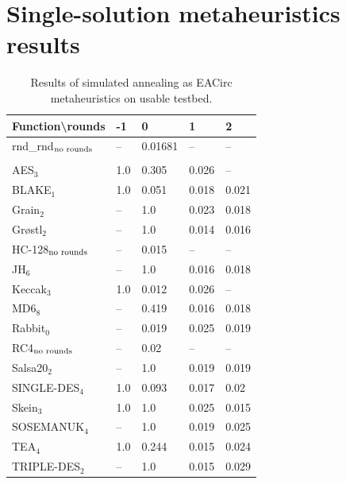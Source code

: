 \documentclass[
  print, %
  Table,   %
  nolof,     %
  nolot,     %
  11pt, %
  oneside  %
]{fithesis3}
\newcommand{\fd}{\cellcolor{myred!15}}
\newcommand{\fn}{\cellcolor{mygreen!20}}
\begin{document}
\chapter{Single-solution metaheuristics results}
\label{sec:app-ss-res}

\begin{table}[H]
\centering
\begin{tabular}{l|l l l l}
Function\textbackslash{}rounds & -1 & 0 & 1 & 2\\ \hline
rnd\_rnd$_{\textnormal{no rounds}}$ & -- & \fn{}0.01681& -- & --    \\\\
AES$_{3}$        & \fd{}1.0   & \fd{}0.305 & \fn{}0.026 & \fn{}--   \\
BLAKE$_{1}$      & \fd{}1.0   & \fd{}0.051 & \fn{}0.018 & \fn{}0.021\\
Grain$_{2}$      & \fd{}--    & \fd{}1.0   & \fn{}0.023 & \fn{}0.018\\
Gr\o stl$_{2}$   & \fd{}--    & \fd{}1.0   & \fn{}0.014 & \fn{}0.016\\
HC-128$_{\textnormal{no rounds}}$& -- & \fn{}0.015 & -- & --        \\
JH$_{6}$         & \fd{}--    & \fd{}1.0   & \fn{}0.016 & \fn{}0.018\\
Keccak$_{3}$     & \fd{}1.0   & \fn{}0.012 & \fn{}0.026 & \fn{}--   \\
MD6$_{8}$        & \fd{}--    & \fd{}0.419 & \fn{}0.016 & \fn{}0.018\\
Rabbit$_{0}$     &      --    & \fn{}0.019 & \fn{}0.025 & \fn{}0.019\\
RC4$_{\textnormal{no rounds}}$& -- & \fn{}0.02  & --    & --        \\
Salsa20$_{2}$    & \fd{}--    & \fd{}1.0   & \fn{}0.019 & \fn{}0.019\\
SINGLE-DES$_{4}$ & \fd{}1.0   & \fd{}0.093 & \fn{}0.017 & \fn{}0.02 \\
Skein$_{3}$      & \fd{}1.0   & \fd{}1.0   & \fn{}0.025 & \fn{}0.015\\
SOSEMANUK$_{4}$  & \fd{}--    & \fd{}1.0   & \fn{}0.019 & \fn{}0.025\\
TEA$_{4}$        & \fd{}1.0   & \fd{}0.244 & \fn{}0.015 & \fn{}0.024\\
TRIPLE-DES$_{2}$ & \fd{}--    & \fd{}1.0   & \fn{}0.015 & \fn{}0.029
\end{tabular}
\caption{Results of simulated annealing as EACirc metaheuristics on usable testbed.}
\label{table:res-usable-sa}
\end{table}
\end{document}
